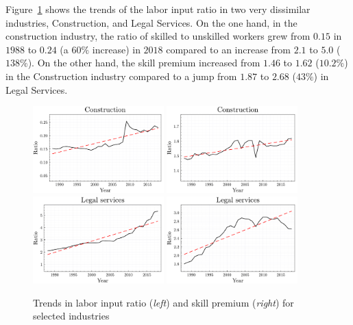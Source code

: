 \documentclass[12pt]{article}
\begin{document}
Figure~\ref{fig:labor_input_skill_premium_trends_s_ind} shows the trends of the labor input ratio in two very dissimilar industries, Construction, and Legal Services. On the one hand, in the construction industry, the ratio of skilled to unskilled workers grew from $0.15$ in $1988$ to $0.24$ (a $60\%$ increase) in $2018$ compared to an increase from $2.1$ to $5.0$ ($138\%$). On the other hand, the skill premium increased from $1.46$ to $1.62$ ($10.2\%$) in the Construction industry compared to a jump from $1.87$ to $2.68$ ($43\%$) in Legal Services. 

\begin{figure}%
 \includegraphics[width=0.45\textwidth]{../images/industries/labor_input_ratio/inc23.pdf}
 \hfill
 \includegraphics[width=0.45\textwidth]{../images/industries/skill_premium/inc23.pdf}
 \vfill
 \includegraphics[width=0.45\textwidth]{../images/industries/labor_input_ratio/inc5411.pdf}
 \hfill
 \includegraphics[width=0.45\textwidth]{../images/industries/skill_premium/inc5411.pdf}
 
 \caption{\label{fig:labor_input_skill_premium_trends_s_ind} Trends in labor input ratio (\textit{left}) and skill premium (\textit{right}) for selected industries}
\end{figure}
\end{document}
